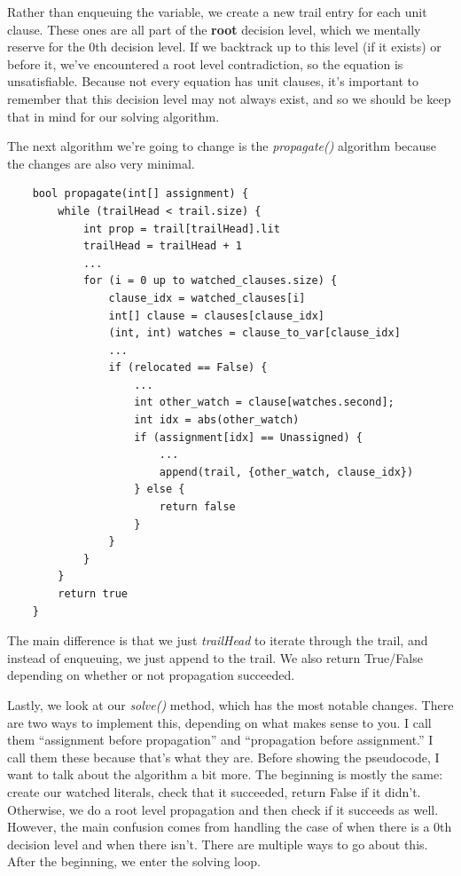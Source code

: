 \documentclass[../main.tex]{subfiles}
\begin{document}
Rather than enqueuing the variable, we create a new trail entry for each unit 
clause. These ones are all part of the \textbf{root} decision level, which we 
mentally reserve for the 0th decision level. If we backtrack up to this level (if it exists)
or before it, we've encountered a root level contradiction, so the equation is 
unsatisfiable. Because not every equation has unit clauses, it's important to 
remember that this decision level may not always exist, and so we should be 
keep that in mind for our solving algorithm. 

The next algorithm we're going to change is the \textit{propagate()} algorithm 
because the changes are also very minimal.

\begin{lstlisting}
    bool propagate(int[] assignment) {
        while (trailHead < trail.size) {
            int prop = trail[trailHead].lit
            trailHead = trailHead + 1
            ...
            for (i = 0 up to watched_clauses.size) {
                clause_idx = watched_clauses[i]
                int[] clause = clauses[clause_idx]
                (int, int) watches = clause_to_var[clause_idx]
                ...
                if (relocated == False) {
                    ...
                    int other_watch = clause[watches.second];
                    int idx = abs(other_watch)
                    if (assignment[idx] == Unassigned) {
                        ...
                        append(trail, {other_watch, clause_idx})
                    } else {
                        return false
                    }
                }
            }
        }
        return true
    }
\end{lstlisting}

The main difference is that we just \textit{trailHead} to iterate through the trail, and 
instead of enqueuing, we just append to the trail. We also return True/False depending on 
whether or not propagation succeeded.

Lastly, we look at our \textit{solve()} method, which has the most notable changes.
There are two ways to implement this, depending on what makes sense to you. I call 
them ``assignment before propagation'' and ``propagation before assignment.'' I
call them these because that's what they are. Before showing the pseudocode, I 
want to talk about the algorithm a bit more. The beginning is mostly the same:
create our watched literals, check that it succeeded, return False if it didn't. 
Otherwise, we do a root level propagation and then check if it succeeds as well.
However, the main confusion comes from handling the case of when there is a 
0th decision level and when there isn't. There are multiple ways to go about this.
After the beginning, we enter the solving loop. 
\end{document}
